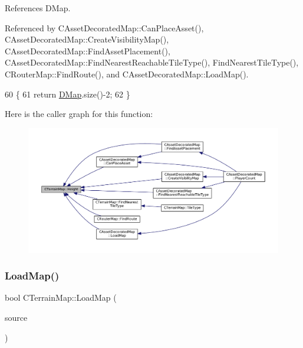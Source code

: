 References D\+Map.



Referenced by C\+Asset\+Decorated\+Map\+::\+Can\+Place\+Asset(), C\+Asset\+Decorated\+Map\+::\+Create\+Visibility\+Map(), C\+Asset\+Decorated\+Map\+::\+Find\+Asset\+Placement(), C\+Asset\+Decorated\+Map\+::\+Find\+Nearest\+Reachable\+Tile\+Type(), Find\+Nearest\+Tile\+Type(), C\+Router\+Map\+::\+Find\+Route(), and C\+Asset\+Decorated\+Map\+::\+Load\+Map().


\begin{DoxyCode}
60                              \{
61     \textcolor{keywordflow}{return} \hyperlink{classCTerrainMap_a80d154ce478948b10473534a7bca13f6}{DMap}.size()-2;
62 \}
\end{DoxyCode}
Here is the caller graph for this function\+:\nopagebreak
\begin{figure}[H]
\begin{center}
\leavevmode
\includegraphics[width=350pt]{classCTerrainMap_ae5e4bf6507e0e3e9ac0322b43eed8a7a_icgraph}
\end{center}
\end{figure}
\hypertarget{classCTerrainMap_a620258ecf38afb6275c865dad4fc4af4}{}\label{classCTerrainMap_a620258ecf38afb6275c865dad4fc4af4} 
\subsubsection{\texorpdfstring{Load\+Map()}{LoadMap()}}
{\footnotesize\ttfamily bool C\+Terrain\+Map\+::\+Load\+Map (\begin{DoxyParamCaption}\item[{std\+::shared\+\_\+ptr$<$ \hyperlink{classCDataSource}{C\+Data\+Source} $>$}]{source }\end{DoxyParamCaption})\hspace{0.3cm}{\ttfamily [virtual]}}



